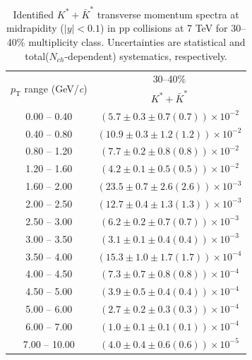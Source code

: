 \begin{table}
\caption{Identified $K^{*} + \bar{K}^{*}$ transverse momentum spectra at midrapidity ($|y|<0.1$) in pp collisions at 7 TeV for 30--40\% multiplicity class. Uncertainties are statistical and total($N_{ch}$-dependent) systematics, respectively.}
\label{tab:KStar_30to40}
\begin{center}
\begin{tabular}{ c | c }
\hline
\multirow{2}{*}{$p_{\mathrm{T}}$ range (GeV/\textit{c})} & \multicolumn{1}{c}{30--40\%} \\ & $K^{*} + \bar{K}^{*}$\\ 
\hline
0.00 -- 0.40 & $(5.7\pm0.3\pm0.7(0.7))\times10^{-2}$ \\ 
0.40 -- 0.80 & $(10.9\pm0.3\pm1.2(1.2))\times10^{-2}$ \\ 
0.80 -- 1.20 & $(7.7\pm0.2\pm0.8(0.8))\times10^{-2}$ \\ 
1.20 -- 1.60 & $(4.2\pm0.1\pm0.5(0.5))\times10^{-2}$ \\ 
1.60 -- 2.00 & $(23.5\pm0.7\pm2.6(2.6))\times10^{-3}$ \\ 
2.00 -- 2.50 & $(12.7\pm0.4\pm1.3(1.3))\times10^{-3}$ \\ 
2.50 -- 3.00 & $(6.2\pm0.2\pm0.7(0.7))\times10^{-3}$ \\ 
3.00 -- 3.50 & $(3.1\pm0.1\pm0.4(0.4))\times10^{-3}$ \\ 
3.50 -- 4.00 & $(15.3\pm1.0\pm1.7(1.7))\times10^{-4}$ \\ 
4.00 -- 4.50 & $(7.3\pm0.7\pm0.8(0.8))\times10^{-4}$ \\ 
4.50 -- 5.00 & $(3.9\pm0.5\pm0.4(0.4))\times10^{-4}$ \\ 
5.00 -- 6.00 & $(2.7\pm0.2\pm0.3(0.3))\times10^{-4}$ \\ 
6.00 -- 7.00 & $(1.0\pm0.1\pm0.1(0.1))\times10^{-4}$ \\ 
7.00 -- 10.00 & $(4.0\pm0.4\pm0.6(0.6))\times10^{-5}$ \\ 
\hline
\end{tabular}
\end{center}
\end{table}
 
